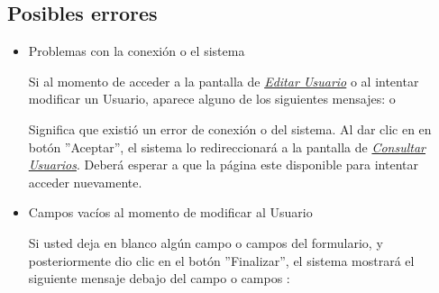                 \subsection{Posibles errores}
                    \begin{itemize}
                        \item Problemas con la conexión o el sistema
                    
                            Si al momento de acceder a la pantalla de \hyperlink{editarUs}{\textit{Editar Usuario}} o al intentar modificar un Usuario, aparece alguno de los siguientes mensajes:
                            o 
                        
                            Significa que existió un error de conexión o del sistema. Al dar clic en en botón ''Aceptar'', el sistema lo redireccionará  a la pantalla de \hyperlink{consultarUs}{\textit{Consultar Usuarios}}. Deberá esperar a que la página este disponible para intentar acceder nuevamente.
                    
                        \item Campos vacíos al momento de modificar al Usuario
                    
                            Si usted deja en blanco algún campo o campos del formulario, y posteriormente dio clic en el botón ''Finalizar'', el sistema mostrará el siguiente mensaje debajo del campo o campos :
                           
                           

\end{itemize}
